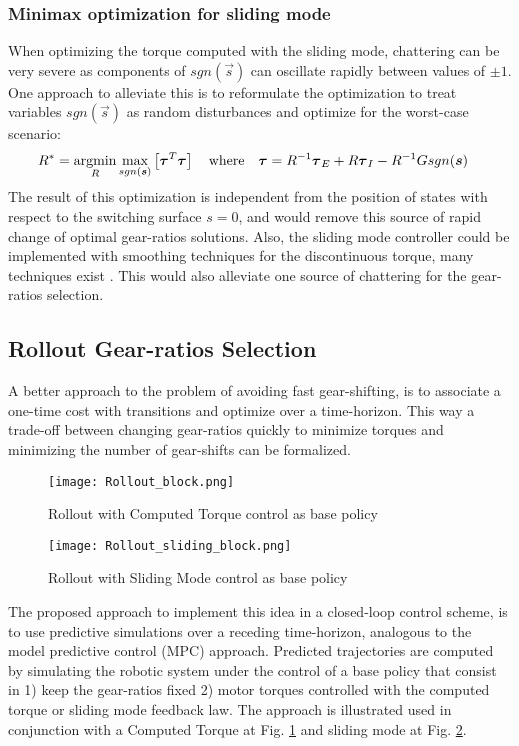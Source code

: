 \subsubsection{Minimax optimization for sliding mode}
\label{sec:minimax}

When optimizing the torque computed with the sliding mode, chattering can be very severe as components of $sgn( \vec{s} )$ can oscillate rapidly between values of $\pm1$. One approach to alleviate this is to reformulate the optimization to treat variables $sgn( \vec{s} )$ as random disturbances and optimize for the worst-case scenario:
%
\begin{align}
R^{*} &= \operatornamewithlimits{argmin}\limits_{R} \operatornamewithlimits{max}\limits_{sgn(\vec{s})} \left[ \vec{\tau}^T\vec{\tau}  \right] \quad\text{where}\quad \vec{\tau} = R^{-1} \vec{\tau}_{E} + R \vec{\tau}_{I} - R^{-1} G sgn( \vec{s} ) 
\end{align} 
%
The result of this optimization is independent from the position of states with respect to the switching surface $s=0$, and would remove this source of rapid change of optimal gear-ratios solutions. Also, the sliding mode controller could be implemented with smoothing techniques for the discontinuous torque, many techniques exist \cite{slotine_applied_1991} \cite{perruquetti_sliding_2002}. This would also alleviate one source of chattering for the gear-ratios selection.

\subsection{Rollout Gear-ratios Selection}

A better approach to the problem of avoiding fast gear-shifting, is to associate a one-time cost with transitions and optimize over a time-horizon. This way a trade-off between changing gear-ratios quickly to minimize torques and minimizing the number of gear-shifts can be formalized.
%
\begin{figure}[tp]
	\centering
		\texttt{[image: Rollout\_block.png]}
	\caption{Rollout with Computed Torque control as base policy}
	\label{fig:Rollout_block}
\end{figure}
%
\begin{figure}[tp]
	\centering
		\texttt{[image: Rollout\_sliding\_block.png]}
	\caption{Rollout with Sliding Mode control as base policy}
	\label{fig:Rollout_sliding_block}
\end{figure}
%
The proposed approach to implement this idea in a closed-loop control scheme, is to use predictive simulations over a receding time-horizon, analogous to the model predictive control (MPC) approach. Predicted trajectories are computed by simulating the robotic system under the control of a base policy that consist in 1) keep the gear-ratios fixed 2) motor torques controlled with the computed torque or sliding mode feedback law.  The approach is illustrated used in conjunction with a Computed Torque at Fig. \ref{fig:Rollout_block} and sliding mode at Fig. \ref{fig:Rollout_sliding_block}.

